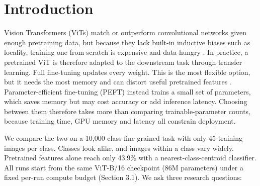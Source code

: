 \begin{abstract}
Pretrained Vision Transformers can be adapted to a new task by fine-tuning every weight or parameter-efficient fine-tuning (PEFT). We compare the two on 10,000 fine-grained classes with 45 training images each, and a fixed per-run compute budget (Section 3.1). We ask how close PEFT gets to a well-tuned full fine-tune, how a fixed PEFT budget should be spent, and what limits the adapted model. On the validation set, full fine-tuning with a prototype-initialised cosine head, layer-wise learning-rate decay and 448 px training achieves 84.07\% top-1 accuracy. AdaptFormer with LoRA, training 4.94\% of the backbone, achieves 83.08\%: within 1.0 percentage point, with less memory but no reduction in training time and slower inference. The choice of trainable parameters matters more than their quantity. Most remaining errors are near misses: the true class is in the top five for 64\% of them. An attention-guided zoom and kNN re-ranking against individual training images add 1.6--2.0 pp without retraining, and the best model reaches 83.84\% on the unseen test set, only 0.23 pp below its validation score. Adapting a pretrained model is a joint design problem: resolution, optimisation, parameter allocation and prediction all interact.
\end{abstract}

\section{Introduction}\label{introduction}

Vision Transformers (ViTs) match or outperform convolutional networks given enough pretraining data, but because they lack built-in inductive biases such as locality, training one from scratch is expensive and data-hungry \citep{dosovitskiy2021vit}. In practice, a pretrained ViT is therefore adapted to the downstream task through transfer learning. Full fine-tuning updates every weight. This is the most flexible option, but it needs the most memory and can distort useful pretrained features \citep{kumar2022lpft}. Parameter-efficient fine-tuning (PEFT) instead trains a small set of parameters, which saves memory but may cost accuracy or add inference latency. Choosing between them therefore takes more than comparing trainable-parameter counts, because training time, GPU memory and latency all constrain deployment.

We compare the two on a 10,000-class fine-grained task with only 45 training images per class. Classes look alike, and images within a class vary widely. Pretrained features alone reach only 43.9\% with a nearest-class-centroid classifier. All runs start from the same ViT-B/16 checkpoint (86M parameters) under a fixed per-run compute budget (Section 3.1). We ask three research questions:

